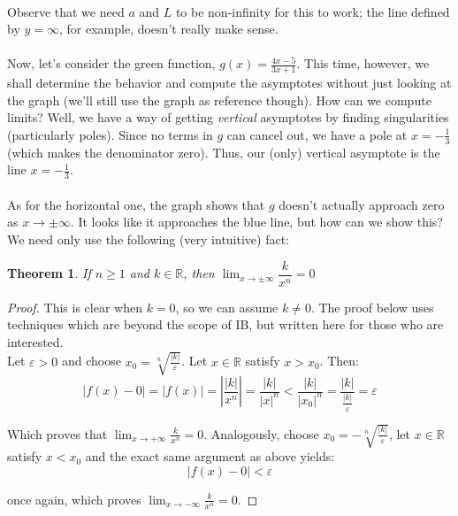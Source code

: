 \documentclass[12pt, a4paper, titlepage, twoside]{article}
\newcommand*{\R}{\mathbb{R}}
\newtheorem*{theorem*}{Theorem}
\begin{document}
	\paragraph{}
	Observe that we need $a$ and $L$ to be non-infinity for this to work; the line defined by $y = \infty$, for example, doesn't really make sense.
	
	\paragraph{}
	Now, let's consider the green function, $g(x) = \frac{4x-5}{3x+1}$. This time, however, we shall determine the behavior and compute the 
	asymptotes without just looking at the graph (we'll still use the graph as reference though). How can we compute limits? Well, we have
	a way of getting \textit{vertical} asymptotes by finding singularities (particularly poles). Since no terms in $g$ can cancel out, we have
	a pole at $x = -\frac{1}{3}$ (which makes the denominator zero). Thus, our (only) vertical asymptote is the line $x = -\frac{1}{3}$.
	
	\paragraph{}
	As for the horizontal one, the graph shows that $g$ doesn't actually approach zero as $x \to \pm \infty$. It looks like it approaches the
	blue line, but how can we show this? We need only use the following (very intuitive) fact:\\
	
	\begin{pf}
		\begin{theorem*}
			If $n \geqslant 1$ and $k \in \R$, then $\displaystyle \lim_{x \to \pm \infty} \dfrac{k}{x^n} = 0$
		\end{theorem*}

		\tcbline		
		
		\begin{proof}
			This is clear when $k=0$, so we can assume $k \neq 0$. The proof below uses techniques which are beyond the scope 
			of IB, but written here for those who are interested.\\
			
			Let $\varepsilon > 0$ and choose $x_0 = \sqrt[n]{\frac{|k|}{\varepsilon}}$. Let $x \in \R$ satisfy $x >x_0$. Then:
			\[ |f(x) - 0| = |f(x)| = \left\vert \dfrac{|k|}{x^n} \right\vert = \dfrac{|k|}{|x|^n} < \dfrac{|k|}{|x_0|^n} = \dfrac{|k|}{\tfrac{|k|}
			{\varepsilon}} = \varepsilon \]
			
			Which proves that $\displaystyle \lim_{x \to +\infty} \frac{k}{x^n} = 0$. Analogously, choose $x_0 = -\sqrt[n]{\frac{|k|}{\varepsilon}}$,
			let $x \in \R$ satisfy $x < x_0$ and the exact same argument as above yields:
			\[ |f(x) - 0| < \varepsilon \]
			
			once again, which proves $\displaystyle \lim_{x \to -\infty} \frac{k}{x^n} = 0$.
		\end{proof}
	\end{pf}
	
\end{document}
